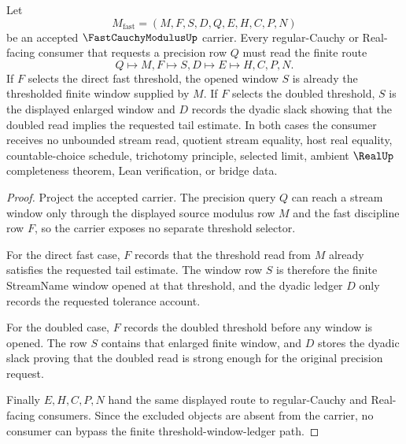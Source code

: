 \begin{theorem}
\label{thm:fast-cauchy-modulus-doubling-window}
Let
$$
M_{\mathrm{fast}}=(M,F,S,D,Q,E,H,C,P,N)
$$
be an accepted $\FastCauchyModulusUp$ carrier. Every regular-Cauchy or Real-facing consumer that requests a precision row $Q$ must read the finite route
$$
Q \longmapsto M,F \longmapsto S,D \longmapsto E \longmapsto H,C,P,N .
$$
If $F$ selects the direct fast threshold, the opened window $S$ is already the thresholded finite window supplied by $M$. If $F$ selects the doubled threshold, $S$ is the displayed enlarged window and $D$ records the dyadic slack showing that the doubled read implies the requested tail estimate. In both cases the consumer receives no unbounded stream read, quotient stream equality, host real equality, countable-choice schedule, trichotomy principle, selected limit, ambient $\RealUp$ completeness theorem, Lean verification, or bridge data.
\end{theorem}
\begin{proof}
Project the accepted carrier. The precision query $Q$ can reach a stream window only through the displayed source modulus row $M$ and the fast discipline row $F$, so the carrier exposes no separate threshold selector.

For the direct fast case, $F$ records that the threshold read from $M$ already satisfies the requested tail estimate. The window row $S$ is therefore the finite StreamName window opened at that threshold, and the dyadic ledger $D$ only records the requested tolerance account.

For the doubled case, $F$ records the doubled threshold before any window is opened. The row $S$ contains that enlarged finite window, and $D$ stores the dyadic slack proving that the doubled read is strong enough for the original precision request.

Finally $E,H,C,P,N$ hand the same displayed route to regular-Cauchy and Real-facing consumers. Since the excluded objects are absent from the carrier, no consumer can bypass the finite threshold-window-ledger path.
\end{proof}

